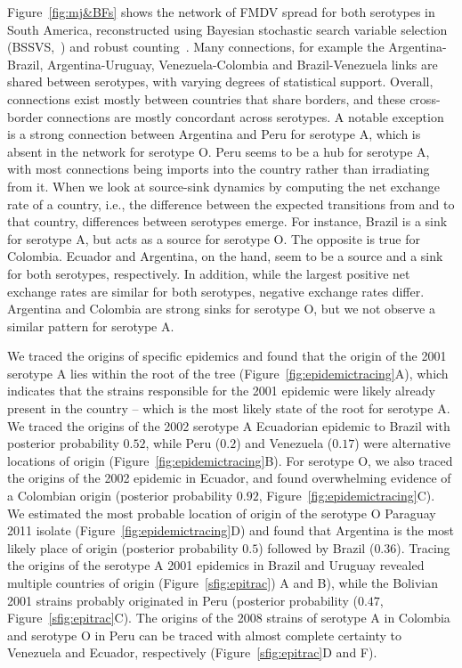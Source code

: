 \documentclass[10pt]{article}
\begin{document}
Figure~\ref{fig:mj&BFs} shows the network of FMDV spread for both serotypes in South America, reconstructed using Bayesian stochastic search variable selection (BSSVS,~\cite{Lemey2009}) and robust counting~\citep{Minin2008b}. 
Many connections, for example the Argentina-Brazil, Argentina-Uruguay, Venezuela-Colombia and Brazil-Venezuela links are shared between serotypes, with varying degrees of statistical support.
Overall, connections exist mostly between countries that share borders, and these cross-border connections are mostly concordant across serotypes.
A notable exception is a strong connection between Argentina and Peru for serotype A, which is absent in the network for serotype O.
Peru seems to be a hub for serotype A, with most connections being imports into the country rather than irradiating from it.
When we look at source-sink dynamics by computing the net exchange rate of a country, i.e., the difference between the expected transitions from and to that country, differences between serotypes emerge.
For instance,  Brazil is a sink for serotype A, but acts as a source for serotype O.
The opposite is true for Colombia.
Ecuador and Argentina, on the hand, seem to be a source and a sink for both serotypes, respectively.
In addition, while the largest positive net exchange rates are similar for both serotypes, negative exchange rates differ.
Argentina and Colombia are strong sinks for serotype O, but we not observe a similar pattern for serotype A. 

We traced the origins of specific epidemics and found that the origin of the 2001 serotype A lies within the root of the tree (Figure~\ref{fig:epidemictracing}A), which indicates that the strains responsible for the 2001 epidemic were likely already present in the country -- which is the most likely state of the root for serotype A.
We traced the origins of the 2002 serotype A Ecuadorian epidemic to Brazil with posterior probability $0.52$, while Peru ($0.2$) and Venezuela ($0.17$) were alternative locations of origin (Figure~\ref{fig:epidemictracing}B).
For serotype O, we also traced the origins of the 2002 epidemic in Ecuador, and found overwhelming evidence of a Colombian origin (posterior probability $0.92$, Figure~\ref{fig:epidemictracing}C).
We estimated the most probable location of origin of the serotype O Paraguay 2011 isolate (Figure~\ref{fig:epidemictracing}D) and found that Argentina is the most likely place of origin (posterior probability $0.5$) followed by Brazil ($0.36$).
Tracing the origins of the serotype A 2001 epidemics in Brazil and Uruguay revealed multiple countries of origin (Figure~\ref{sfig:epitrac}) A and B), while the Bolivian 2001 strains probably originated in Peru (posterior probability ($0.47$, Figure~\ref{sfig:epitrac}C).
The origins of the 2008 strains of serotype A in Colombia  and serotype O in Peru can be traced with almost complete certainty to Venezuela and Ecuador, respectively (Figure~\ref{sfig:epitrac}D and F).
\end{document}
